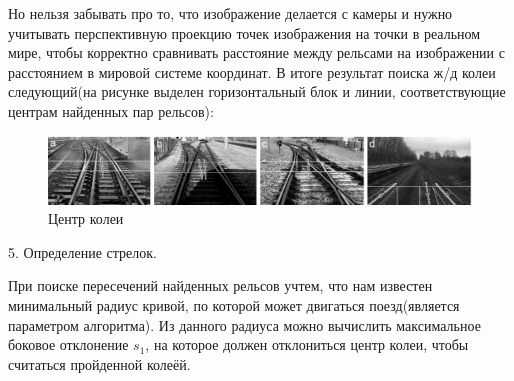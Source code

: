 Но нельзя забывать про то, что изображение делается с камеры и нужно учитывать перспективную проекцию \cite{b:projection} точек изображения на точки в реальном мире, чтобы корректно сравнивать расстояние между рельсами на изображении с расстоянием в мировой системе координат. 
В итоге результат поиска ж/д колеи следующий(на рисунке выделен горизонтальный блок и линии, соответствующие центрам найденных пар рельсов):
\begin{figure}[!h]
	\centering
	\includegraphics[width=1\linewidth,height=0.5\linewidth]{pictures/screenshot006}
	\caption{Центр колеи}
	\label{fig:screenshot006}
\end{figure}

5. Определение стрелок.

При поиске пересечений найденных рельсов учтем, что нам известен минимальный радиус
кривой, по которой может двигаться поезд(является параметром алгоритма). Из данного радиуса можно вычислить максимальное боковое отклонение $s_1$, на которое должен отклониться центр колеи, чтобы считаться пройденной колеёй. 

